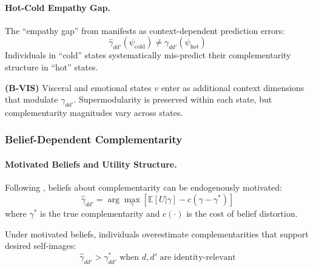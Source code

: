 \paragraph{Hot-Cold Empathy Gap.}

The ``empathy gap'' from \citet{loewenstein2005hot} manifests as context-dependent 
prediction errors:
\begin{equation}
\hat{\gamma}_{dd'}(\psi_{\text{cold}}) \neq \gamma_{dd'}(\psi_{\text{hot}})
\end{equation}
Individuals in ``cold'' states systematically mis-predict their complementarity 
structure in ``hot'' states.

\begin{axiom}
\label{ax:B-VIS}
\textbf{(B-VIS)} Visceral and emotional states $v$ enter as additional context 
dimensions that modulate $\gamma_{dd'}$. Supermodularity is preserved within 
each state, but complementarity magnitudes vary across states.
\end{axiom}

\subsubsection{Belief-Dependent Complementarity}

\paragraph{Motivated Beliefs and Utility Structure.}

Following \citet{benabou2016mindful}, beliefs about complementarity can be 
endogenously motivated:
\begin{equation}
\hat{\gamma}_{dd'} = \arg\max_{\gamma} \left[ 
\mathbb{E}[U | \gamma] - c(\gamma - \gamma^*) 
\right]
\end{equation}
where $\gamma^*$ is the true complementarity and $c(\cdot)$ is the cost of 
belief distortion.

\begin{proposition}
\label{prop:motivated-gamma}
Under motivated beliefs, individuals overestimate complementarities that 
support desired self-images:
\begin{equation}
\hat{\gamma}_{dd'} > \gamma^*_{dd'} \text{ when } d, d' \text{ are identity-relevant}
\end{equation}
\end{proposition}

